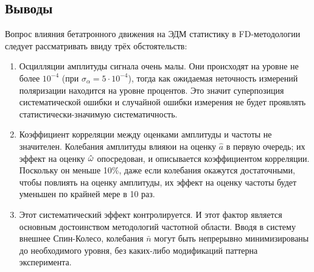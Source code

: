 \subsection{Выводы}
Вопрос влияния бетатронного движения на ЭДМ статистику в FD-методологии следует рассматривать
ввиду трёх обстоятельств:
\begin{enumerate}
\item Осцилляции амплитуды сигнала очень малы. Они происходят на уровне не более $10^{-4}$ (при
  $\sigma_{\alpha}=5\cdot 10^{-4}$), тогда как ожидаемая неточность измерений поляризации находится
  на уровне процентов. Это значит суперпозиция систематической ошибки и случайной ошибки измерения
  не будет проявлять статистически-значимую систематичность.
\item Коэффициент корреляции между оценками амплитуды и частоты не значителен. Колебания амплитуды
  влияюи на оценку $\hat a$ в первую очередь; их эффект на оценку $\hat{\omega}$ опосредован, и описывается
  коэффициентом корреляции. Поскольку он меньше 10\%, даже если колебания окажутся достаточными, чтобы повлиять
  на оценку амплитуды, их эффект на оценку частоты будет уменьшен по крайней мере в 10 раз.
\item Этот систематический эффект контролируется. И этот фактор является основным достоинством методологий
  частотной области. Вводя в систему внешнее Спин-Колесо, колебания $\bar n$ могут быть непрерывно минимизированы
  до необходимого уровня, без каких-либо модификаций паттерна эксперимента.
\end{enumerate}

